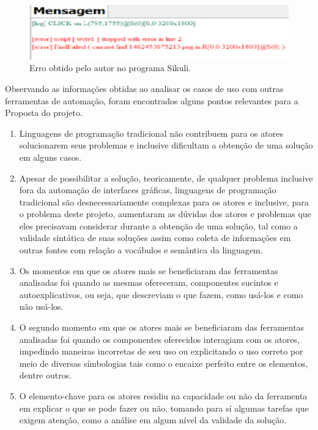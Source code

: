 \documentclass[tg]{mdtufsm}
\begin{document}
            	\begin{figure}[!htb]
            		{\centering
            		\includegraphics[width=1.0\textwidth]{imagens/sikuli_error}
            		\caption{Erro obtido pelo autor no programa Sikuli.}
            		\label{fig:erroSikuli}}
            	\end{figure}

                Observando as informações obtidas ao analisar os casos de uso com outras ferramentas de automação, foram encontrados alguns pontos relevantes para a Proposta do projeto.

                \begin{enumerate}
                   \item Linguagens de programação tradicional não contribuem para os atores solucionarem seus problemas e inclusive dificultam a obtenção de uma solução em alguns casos.

                   \item Apesar de possibilitar a solução, teoricamente, de qualquer problema inclusive fora da automação de interfaces gráficas, linguagens de programação tradicional são desnecessariamente complexas para os atores e inclusive, para o problema deste projeto, aumentaram as dúvidas dos atores e problemas que eles precisavam considerar durante a obtenção de uma solução, tal como a validade sintática de suas soluções assim como coleta de informações em outras fontes com relação a vocábulos e semântica da linguagem.

                   \item Os momentos em que os atores mais se beneficiaram das ferramentas analisadas foi quando as mesmas ofereceram, componentes sucintos e autoexplicativos, ou seja, que descreviam o que fazem, como usá-los e como não usá-los.

                   \item O segundo momento em que os atores mais se beneficiaram das ferramentas analisadas foi quando os componentes oferecidos interagiam com os atores, impedindo maneiras incorretas de seu uso ou explicitando o uso correto por meio de diversas símbologias tais como o encaixe perfeito entre os elementos, dentre outros.

                   \item O elemento-chave para os atores residiu na capacidade ou não da ferramenta em explicar o que se pode fazer ou não, tomando para sí algumas tarefas que exigem atenção, como a análise em algum nível da validade da solução.
                \end{enumerate}
\end{document}
